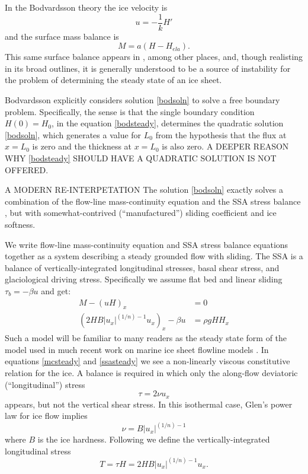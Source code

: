 \documentclass[twocolumn,letterpaper]{igs}
\begin{document}
In the Bodvardsson theory the ice velocity is
\begin{equation}
u = - \frac{1}{k} H' \label{bodstressbalance}
\end{equation}
and the surface mass balance is
\begin{equation}
M = a (H - H_{ela}).  \label{bodmassbalance}
\end{equation}
This same surface balance appears in \cite{Weertman61stability,Jouvetetal2011}, among other places, and, though realisting in its broad outlines, it is generally understood to be a source of instability for the problem of determining the steady state of an ice sheet.

Bodvardsson explicitly considers solution \eqref{bodsoln} to solve a free boundary problem.  Specifically, the sense is that the single boundary condition $H(0)=H_0$, in the equation \eqref{bodsteady}, determines the quadratic solution \eqref{bodsoln}, which generates a value for $L_0$ from the hypothesis that the flux at $x=L_0$ is zero and the thickness at $x=L_0$ is also zero.  A DEEPER REASON WHY \eqref{bodsteady} SHOULD HAVE A QUADRATIC SOLUTION IS NOT OFFERED.

A MODERN RE-INTERPETATION  The solution \eqref{bodsoln} exactly solves a combination of the flow-line mass-continuity equation and the SSA stress balance \citep{MacAyeal,WeisGreveHutter}, but with somewhat-contrived (``manufactured'') sliding coefficient and ice softness.

We write flow-line mass-continuity equation and SSA stress balance equations together as a system describing a steady grounded flow with sliding.  The SSA is a balance of vertically-integrated longitudinal stresses, basal shear stress, and glaciological driving stress.  Specifically we assume flat bed and linear sliding $\tau_b = -\beta u$ and get:
\begin{align}
M - (u H)_x &= 0 \label{mcsteady} \\
\left(2 H B |u_x|^{(1/n)-1} u_x\right)_x - \beta u &= \rho g H H_x  \label{ssasteady}
\end{align}
Such a model will be familiar to many readers as the steady state form of the model used in much recent work on marine ice sheet flowline models \citep[e.g.][]{SchoofMarine1}.  In equations \eqref{mcsteady} and \eqref{ssasteady} we see a non-linearly viscous constitutive relation for the ice.  A balance is required in which only the along-flow deviatoric (``longitudinal'') stress
	$$\tau = 2 \nu u_x$$
appears, but not the vertical shear stress.  In this isothermal case, Glen's power law for ice flow implies
	$$\nu = B |u_x|^{(1/n)-1}$$
where $B$ is the ice hardness.  Following \cite{SchoofStream} we define the vertically-integrated longitudinal stress
\begin{equation}
T = \tau H = 2 H B |u_x|^{(1/n)-1} u_x.  \label{schoofsT}
\end{equation}
\end{document}
